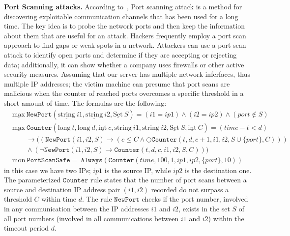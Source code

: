 \documentclass[english]{article}
\begin{document}
\textbf{Port Scanning attacks.}
According to~\cite{kanlayasiri2000rule}, Port scanning attack is a method for discovering exploitable communication channels that has been used for a long time. The key idea is to probe the network ports and then keep the information about them that are useful for an attack.
Hackers frequently employ a port scan approach to find gaps or weak spots in a network. Attackers can use a port scan attack to identify open ports and determine if they are accepting or rejecting data; additionally, it can show whether a company uses firewalls or other active security measures. 
Assuming that our server has multiple network inferfaces, thus multiple IP addresses; the victim machine can presume that port scans are malicious when the counter of reached ports overcomes a specific threshold in a short amount of time. The formulas are the following:
\begin{align*}
    & \underline{\text{max}}\ \mathtt{NewPort}(\underline{\text{string}}\ i1,\underline{\text{string}}\ i2,\underline{\text{Set}}\ S) = (i1=ip1)\land(i2=ip2)\land (port \notin S)\\
    & \underline{\text{max}}\ \mathtt{Counter}(\underline{\text{long}}\ t, \underline{\text{long}}\ d, \underline{\text{int}}\ c,\underline{\text{string}}\ i1,\underline{\text{string}}\ i2,\underline{\text{Set}}\ S,\underline{\text{int}}\ C) = (time-t<d)\\
    & \quad\quad\rightarrow((\mathtt{NewPort}(i1,i2,S)\rightarrow(c\leq C\land \bigcirc\mathtt{Counter}(t,d,c+1,i1,i2,S\cup\{port\},C)))  \\
    & \quad\quad\land(\neg \mathtt{NewPort}(i1,i2,S)\rightarrow\mathtt{Counter}(t,d,c,i1,i2,S,C))) \\
    & \underline{\text{mon}}\ \mathtt{PortScanSafe} =\ \mathtt{Always}(\mathtt{Counter}(time,100,1,ip1,ip2,\{port\},10)) 
\end{align*}
in this case we have two IPs; $ip1$ is the source IP, while $ip2$ is the destination one. The parameterized $\mathtt{Counter}$ rule states that the number of port scans between a source and destination IP  address pair $(i1,i2)$ recorded do not surpass a threshold $C$ within time $d$. The rule $\mathtt{NewPort}$ checks if the port number,
involved in any communication between the IP addresses $i1$ and $i2$, exists in the set $S$ of all port numbers (involved in all communications between $i1$ and $i2$) within the timeout period $d$.
\end{document}
